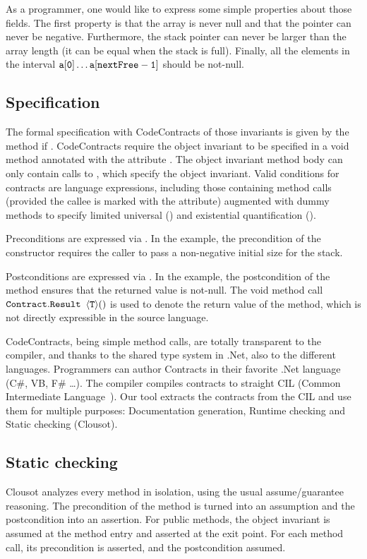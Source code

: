 \documentclass{llncs}
\begin{document}
As a programmer, one would like to express some simple properties about those fields.
The first property is that the array is never null and that the pointer can never be negative.
Furthermore, the stack pointer can never be larger than the array length (it can be equal when the stack is full).
Finally, all the elements in the interval $\mathtt{a[0]} \dots \mathtt{a[nextFree-1]}$ should be not-null.

\subsection{Specification}
The formal specification with CodeContracts of those invariants is
given by the method  if .
CodeContracts require the object invariant to be specified in a void
method annotated with the attribute
.  The object invariant method
body can only contain calls to , which
specify the object invariant.  Valid conditions for contracts are
language expressions, including those containing method calls
(provided the callee is marked with the \code{[Pure]} attribute)
augmented with dummy methods to specify limited universal
() and existential quantification
().

Preconditions are expressed via . 
In the example, the precondition of the  constructor requires the caller to pass a non-negative initial size for the stack.

Postconditions are expressed via .
In the example, the postcondition of the method  ensures that the returned value is not-null.
The void method call $\mathtt{Contract.Result}$ $\langle \mathtt{T} \rangle()$ is used to denote the return value of the method, which is not directly expressible in the source language.

CodeContracts, being simple method calls, are totally transparent to the compiler, and thanks to the shared type system in .Net, also to the different languages.
Programmers can author Contracts in their favorite .Net language (C\#, VB, F\# \dots).
The compiler  compiles contracts to straight CIL (Common Intermediate Language~\cite{ecma}).
Our tool extracts the contracts from the CIL and use them for multiple purposes: Documentation generation, Runtime checking and Static checking (Clousot).

\subsection{Static checking}
Clousot analyzes every method in isolation, using the usual assume/guarantee reasoning.
The precondition of the method is turned into an assumption and the postcondition into an assertion. 
For public methods, the object invariant is assumed at the method entry and asserted at the exit point. 
For each method call, its precondition is asserted, and the postcondition assumed. 
\end{document}
